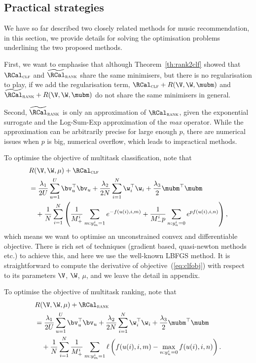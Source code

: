 \subsection{Practical strategies}

We have so far described two closely related methods for music recommendation,
in this section, we provide details for solving the optimisation problems underlining
the two proposed methods.

First, we want to emphasise that although Theorem~\ref{th:rank2clf} showed that
$\RCal_\textsc{clf}$ and $\widetilde\RCal_\textsc{rank}$ share the same minimisers, 
but there is no regularisation to play,
if we add the regularisation term, $\RCal_\textsc{clf} + R(\V, \W, \mubm)$ and 
$\widetilde\RCal_\textsc{rank} + R(\V, \W, \mubm)$ do not share the same minimisers in general.

Second, $\widetilde\RCal_\textsc{rank}$ is only an approximation of $\RCal_\textsc{rank}$,
given the exponential surrogate and the Log-Sum-Exp approximation of the \emph{max} operator.
While the approximation can be arbitrarily precise for large enough $p$, 
there are numerical issues when $p$ is big, \ie numerical overflow, 
which leads to impractical methods.

To optimise the objective of multitask classification, note that 
\begin{equation}
\label{eq:clfobj}
\begin{aligned}
& R(\V, \W, \mu) + \RCal_\textsc{clf} \\
&= \frac{\lambda_1}{2U} \sum_{u=1}^U \bv_u^\top \bv_u + \frac{\lambda_2}{2N} \sum_{i=1}^N \w_i^\top \w_i + \frac{\lambda_3}{2} \mubm^\top \mubm \\
& \quad
   + \frac{1}{N} \sum_{i=1}^N \left( \frac{1}{M_+^i} \sum_{m: y_m^i = 1} e^{-f(u(i), i,m)} + \frac{1}{M_-^i p} \sum_{n: y_n^i = 0} e^{p f(u(i), i,n)} \right),
\end{aligned}
\end{equation}
which means we want to optimise an unconstrained convex and differentiable objective.
There is rich set of techniques (\eg gradient based, quasi-newton methods etc.) to achieve this, and here we use the well-known LBFGS method.
It is straightforward to compute the derivative of objective~(\ref{eq:clfobj}) with respect to its parameters $\V$, $\W$, $\mu$,
and we leave the detail in appendix.

To optimise the objective of multitask ranking, note that
\begin{equation}
\label{eq:rankobj}
\begin{aligned}
& R(\V, \W, \mu) + \RCal_\textsc{rank} \\
&= \frac{\lambda_1}{2U} \sum_{u=1}^U \bv_u^\top \bv_u + \frac{\lambda_2}{2N} \sum_{i=1}^N \w_i^\top \w_i + \frac{\lambda_3}{2} \mubm^\top \mubm \\
& \quad
   + \frac{1}{N} \sum_{i=1}^N \frac{1}{M_+^i} \sum_{m: y_m^i = 1} \ell \left( f(u(i), i, m) - \max_{n: y_n^i = 0} f(u(i), i, n) \right).
\end{aligned}
\end{equation}

